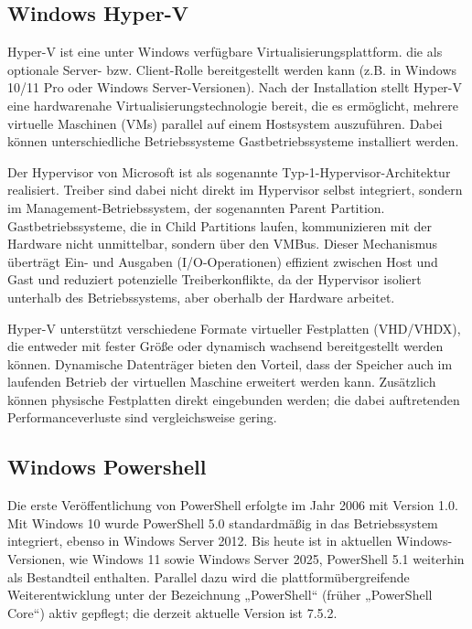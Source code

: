 \documentclass[a4paper,12pt]{article}
\begin{document}
\subsection{Windows Hyper-V}


Hyper-V ist eine unter Windows verfügbare Virtualisierungsplattform. die als optionale Server- bzw. Client-Rolle bereitgestellt werden kann (z.B. in Windows 10/11 Pro oder Windows Server-Versionen). Nach der Installation stellt Hyper-V eine hardwarenahe Virtualisierungstechnologie bereit, die es ermöglicht, mehrere virtuelle Maschinen (VMs) parallel auf einem Hostsystem auszuführen. Dabei können unterschiedliche Betriebssysteme Gastbetriebssysteme installiert werden.


Der Hypervisor von Microsoft ist als sogenannte Typ‑1-Hypervisor-Architektur realisiert. Treiber sind dabei nicht direkt im Hypervisor selbst integriert, sondern im Management-Betriebssystem, der sogenannten Parent Partition. Gastbetriebssysteme, die in Child Partitions laufen, kommunizieren mit der Hardware nicht unmittelbar, sondern über den VMBus. Dieser Mechanismus überträgt Ein- und Ausgaben (I/O-Operationen) effizient zwischen Host und Gast und reduziert potenzielle Treiberkonflikte, da der Hypervisor isoliert unterhalb des Betriebssystems, aber oberhalb der Hardware arbeitet.

Hyper-V unterstützt verschiedene Formate virtueller Festplatten (VHD/VHDX), die entweder mit fester Grö\ss e oder dynamisch wachsend bereitgestellt werden können. Dynamische Datenträger bieten den Vorteil, dass der Speicher auch im laufenden Betrieb der virtuellen Maschine erweitert werden kann. Zusätzlich können physische Festplatten direkt eingebunden werden; die dabei auftretenden Performanceverluste sind vergleichsweise gering.\cite{fayyad2013benchmarking,haga2011windows,aldhamenwindows}\\




\subsection{Windows Powershell}

Die erste Veröffentlichung von PowerShell erfolgte im Jahr 2006 mit Version 1.0. Mit Windows 10 wurde PowerShell 5.0 standardmä\ss ig in das Betriebssystem integriert, ebenso in Windows Server 2012. Bis heute ist in aktuellen Windows-Versionen, wie Windows 11 sowie Windows Server 2025, PowerShell 5.1 weiterhin als Bestandteil enthalten. Parallel dazu wird die plattformübergreifende Weiterentwicklung unter der Bezeichnung „PowerShell“ (früher „PowerShell Core“) aktiv gepflegt; die derzeit aktuelle Version ist 7.5.2.
\end{document}
